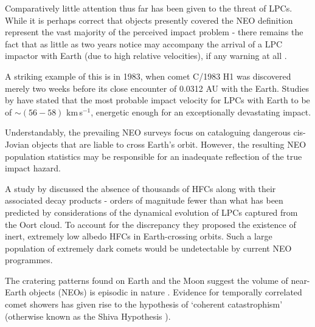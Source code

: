 
Comparatively little attention thus far has been given to the threat of LPCs. While it is perhaps correct that objects presently covered the NEO definition represent the vast majority of the perceived impact problem - there remains the fact that as little as two years notice may accompany the arrival of a LPC impactor with Earth (due to high relative velocities), if any warning at all \citep{1994hdtc.conf..221M}. 

A striking example of this is in 1983, when comet C/1983 H1 was discovered merely two weeks before its close encounter of 0.0312 AU with the Earth. %
Studies by \cite{1997NYASA.822...67W} have stated that the most probable impact velocity for LPCs with Earth to be of $\sim (56-58)$ km$\,$s$^{-1}$, energetic enough for an exceptionally devastating impact.

Understandably, the prevailing NEO surveys focus on cataloguing dangerous cis-Jovian objects that are liable to cross Earth's orbit. However, the resulting NEO population statistics may be responsible for an inadequate reflection of the true impact hazard.

A study by \cite{2004MNRAS.355..191N} discussed the absence of thousands of HFCs along with their associated decay products - orders of magnitude fewer than what has been predicted by considerations of the dynamical evolution of LPCs captured from the Oort cloud. To account for the discrepancy they proposed the existence of inert, extremely low albedo HFCs in Earth-crossing orbits. Such a large population of extremely dark comets would be undetectable by current NEO programmes.

The cratering patterns found on Earth and the Moon suggest the volume of near-Earth objects (NEOs) is episodic in nature \citep{1998ncdb.conf...21N, 1979Natur.282..455N}. Evidence for temporally correlated comet showers has given rise to the hypothesis of `coherent catastrophism' (otherwise known as the Shiva Hypothesis \citep{Rampino1996}).

